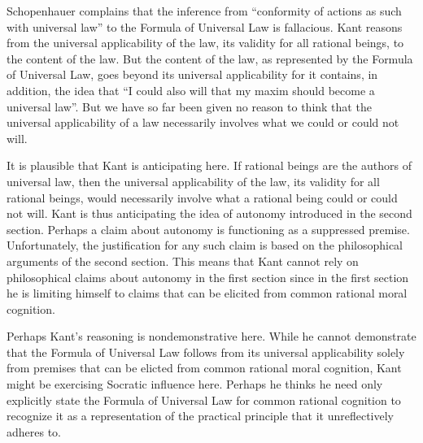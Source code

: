 Schopenhauer complains that the inference from ``conformity of actions as such with universal law'' to the Formula of Universal Law is fallacious. Kant reasons from the universal applicability of the law, its validity for all rational beings, to the content of the law. But the content of the law, as represented by the Formula of Universal Law, goes beyond its universal applicability for it contains, in addition, the idea that ``I could also will that my maxim should become a universal law''. But we have so far been given no reason to think that the universal applicability of a law necessarily involves what we could or could not will.

It is plausible that Kant is anticipating here. If rational beings are the authors of universal law, then the universal applicability of the law, its validity for all rational beings, would necessarily involve what a rational being could or could not will. Kant is thus anticipating the idea of autonomy introduced in the second section. Perhaps a claim about autonomy is functioning as a suppressed premise. Unfortunately, the justification for any such claim is based on the philosophical arguments of the second section. This means that Kant cannot rely on philosophical claims about autonomy in the first section since in the first section he is limiting himself to claims that can be elicited from common rational moral cognition.

Perhaps Kant's reasoning is nondemonstrative here. While he cannot demonstrate that the Formula of Universal Law follows from its universal applicability solely from premises that can be elicted from common rational moral cognition, Kant might be exercising Socratic influence here. Perhaps he thinks he need only explicitly state the Formula of Universal Law for common rational cognition to recognize it as a representation of the practical principle that it unreflectively adheres to. \change

% 

